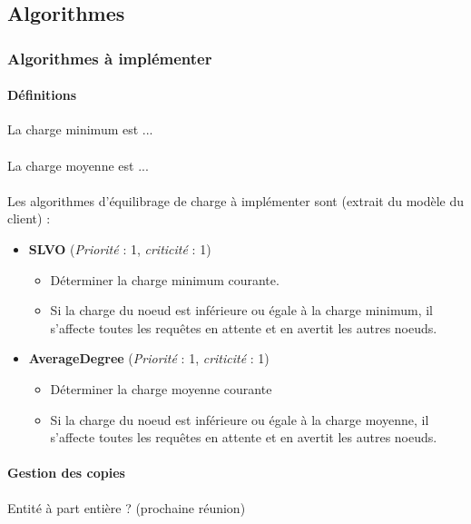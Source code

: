 \documentclass[12pt]{article}
\newcommand{\besoin}[2] {
  (\textit{Priorité} : #1, \textit{criticité} : #2)
}
\begin{document}
\subsection{Algorithmes}

\subsubsection{Algorithmes à implémenter}

\paragraph{Définitions} La charge minimum est ...

\paragraph{} La charge moyenne est ...

\paragraph{} Les algorithmes d'équilibrage de charge à implémenter sont (extrait du modèle du client) :

\begin{itemize}
 \item \textbf{SLVO} \besoin{1}{1} 
 \begin{itemize}
  \item Déterminer la charge minimum courante.
  \item Si la charge du noeud est inférieure ou égale à la charge minimum, il s'affecte toutes les requêtes en attente et en avertit les autres noeuds. \vspace{0.2cm}
 \end{itemize}
 
 \item \textbf{AverageDegree} \besoin{1}{1} 
 \begin{itemize}
  \item Déterminer la charge moyenne courante
  \item Si la charge du noeud est inférieure ou égale à la charge moyenne, il s'affecte toutes les requêtes en attente et en avertit les autres noeuds.
 \end{itemize}

\end{itemize}

\paragraph{Gestion des copies} Entité à part entière ? (prochaine réunion)
\end{document}
